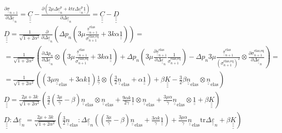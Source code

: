 \documentclass[12pt]{article}
\newcommand\ul[1]{\underline{#1}}
\newcommand\uus{\ul{\ul{s}}}
\newcommand\uue{\ul{\ul{e}}}
\newcommand\uuUnit{\ul{\ul{1}}}
\newcommand\uueps{\ul{\ul{\varepsilon}}}
\newcommand{\uuuuK}{\ul{\ul{\ul{\ul{K}}}}}
\newcommand{\uuuuC}{\ul{\ul{\ul{\ul{C}}}}}
\newcommand{\uuuuD}{\ul{\ul{\ul{\ul{D}}}}}
\newcommand\Deltaepsp{\Delta \uueps_{n}^p}
\newcommand\Deltaeps{\Delta \uueps_{n}}
\newcommand\Deltaep{\Delta \uue_{n}^p}
\newcommand\sigmaeqnelas{\sigma_{n+1}^\text{elas,eq}}
\newcommand\uusnelas{\uus_{n+1}^\text{elas}}
\newcommand\uusigman{\ul{\ul{\sigma}}_{n+1}}
\newcommand{\uunelas}{\ul{\ul{n}}_\text{elas}}
\newcommand\mtr{\mathrm{tr}}
\begin{document}
\begin{align}
    & \frac{\partial\uusigman}{\partial \Deltaeps} = \uuuuC - \frac{\partial (2\mu\Deltaep + k\mtr\Deltaepsp\uuUnit)}{\partial\Deltaeps} = \uuuuC - \uuuuD \\
    & \uuuuD = \frac{1}{\sqrt{1 + 2\alpha^2}} \frac{\partial }{\partial \Deltaeps} \left( \Delta p_n \left( 3\mu \frac{\uusnelas}{\sigmaeqnelas} + 3k\alpha \uuUnit  \right) \right) = \\
    & = \frac{1}{\sqrt{1 + 2\alpha^2}}\left( \frac{\partial\Delta p_n}{\partial\Deltaeps} \otimes \left( 3\mu\frac{\uusnelas}{\sigmaeqnelas} + 3k\alpha \uuUnit \right) + \Delta p_n \left(3\mu\frac{\partial\uusnelas}{\partial\Deltaeps}\frac{1}{\sigmaeqnelas} \right) - \Delta p_n 3\mu\frac{\uusnelas}{(\sigmaeqnelas)^2} \otimes \frac{\partial\sigmaeqnelas}{\partial\Deltaeps}\right) = \\
    & = \frac{1}{\sqrt{1 + 2\alpha^2}}\left( \left( 3\mu \uunelas + 3\alpha k \uuUnit \right) \frac{1}{\gamma} \otimes \left( \frac{3}{2} \uunelas + \alpha\uuUnit \right) + \beta\uuuuK - \frac{3}{2}\beta\uunelas \otimes \uunelas \right) \\
    & \uuuuD = \frac{2\mu + 3k}{\sqrt{1 + 2\alpha^2}}\left( \frac{3}{2} \left(\frac{3\mu}{\gamma} - \beta\right)\uunelas \otimes \uunelas + \frac{9\alpha k}{2\gamma} \uuUnit \otimes \uunelas + \frac{3\mu\alpha}{\gamma} \uunelas \otimes \uuUnit + \beta \uuuuK \right) \\
    & \uuuuD : \Deltaeps = \frac{2\mu + 3k}{\sqrt{1 + 2\alpha^2}}\left( \frac{3}{2} \uunelas : \Deltaeps \left( \left(\frac{3\mu}{\gamma} - \beta\right)\uunelas + \frac{3\alpha k}{\gamma} \uuUnit \right) + \frac{3\mu\alpha}{\gamma} \uunelas \mtr\Deltaeps + \beta \uuuuK \right) \\
\end{align}
\end{document}
